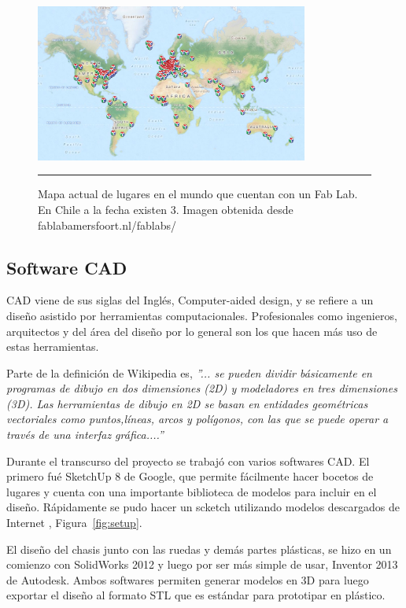 \begin{figure}[htbp]
	\centering
		\includegraphics[width=0.8\textwidth]{./Figures/map.png}
		\rule{35em}{0.5pt}
	\caption[Fablabs]{Mapa actual de lugares en el mundo que cuentan con un Fab Lab. En Chile a la fecha existen 3. Imagen obtenida desde fablabamersfoort.nl/fablabs/}
	\label{fig:Fablabs}
\end{figure}	

\subsection{Software CAD}

CAD viene de sus siglas del Inglés, Computer-aided design, y se refiere a un diseño asistido por herramientas computacionales. Profesionales como ingenieros, arquitectos y del área del diseño por lo general son los que hacen más uso de estas herramientas.

Parte de la definición de Wikipedia es, \textit{”... se pueden dividir básicamente en programas de dibujo en dos dimensiones (2D) y modeladores en tres dimensiones (3D). Las herramientas de dibujo en 2D se basan en entidades geométricas vectoriales como puntos,líneas, arcos y polígonos, con las que se puede operar a través de una interfaz gráfica....”}

Durante el transcurso del proyecto se trabajó con varios softwares CAD. El primero fué SketchUp 8 de Google, que permite fácilmente hacer bocetos de lugares y cuenta con una importante biblioteca de modelos para incluir en el diseño. Rápidamente se pudo hacer un scketch utilizando modelos descargados de Internet , Figura~\ref{fig:setup}.

El diseño del chasis junto con las ruedas y demás partes plásticas, se hizo en un comienzo con SolidWorks 2012 y luego por ser más simple de usar, Inventor 2013 de Autodesk. Ambos softwares permiten generar modelos en 3D para luego exportar el diseño al formato STL que es estándar para prototipar en plástico.


